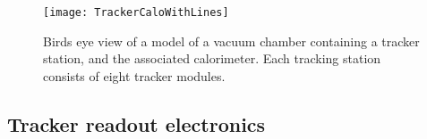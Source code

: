 

\begin{figure}[]
    \centering
    \texttt{[image: TrackerCaloWithLines]}
    \caption[TrackerCaloWithLines]{Birds eye view of a model of a vacuum chamber containing a tracker station, and the associated calorimeter. Each tracking station consists of eight tracker modules.}
    \label{fig:TrackerCaloWithLines}
\end{figure}





\subsection{Tracker readout electronics}



